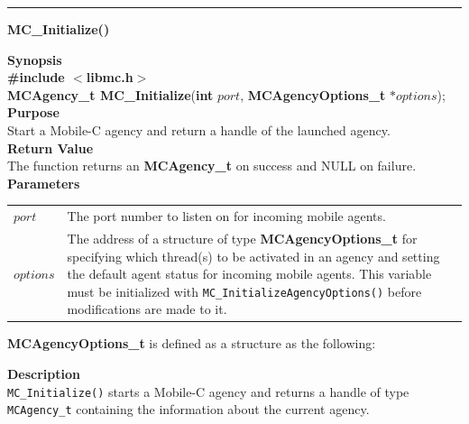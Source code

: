\label{api:MC_Initialize}
\noindent
\vspace{5pt}
\rule{6.5in}{0.015in}
\noindent
{\LARGE \bf MC\_Initialize()}\\
{}

\noindent
{\bf Synopsis}\\
{\bf \#include $<$libmc.h$>$}\\
{\bf MCAgency\_t MC\_Initialize}({\bf int} $port$, {\bf MCAgencyOptions\_t} $*options$);\\

\noindent
{\bf Purpose}\\
Start a Mobile-C agency and return a handle of the launched agency.\\

\noindent
{\bf Return Value}\\
The function returns an {\bf MCAgency\_t} on success and NULL on failure.\\

\noindent
{\bf Parameters}
\vspace{-0.1in}
\begin{description}
\item
\begin{tabular}{p{10 mm}p{145 mm}}
$port$ & The port number to listen on for incoming mobile agents.\\
$options$ & The address of a structure of type {\bf MCAgencyOptions\_t} for 
specifying which thread(s) to be activated in an agency and setting the 
default agent status for incoming mobile agents. This variable must be
initialized with \texttt{MC\_InitializeAgencyOptions()} before
modifications are made to it.
\end{tabular}
\end{description}
{\bf MCAgencyOptions\_t} is defined as a structure as the following:


\noindent
{\bf Description}\\
\texttt{MC\_Initialize()} starts a Mobile-C agency and returns a handle of 
type \texttt{MCAgency\_t} containing the information about the current agency.

